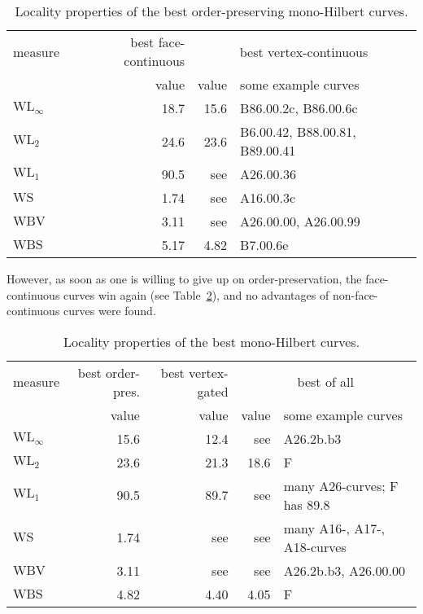 \documentclass[11pt,a4paper]{article}
\def\WLMax{\ensuremath{\mathrm{WL}_\infty}\xspace}
\def\WLEuc{\ensuremath{\mathrm{WL}_2}\xspace}
\def\WLMan{\ensuremath{\mathrm{WL}_1}\xspace}
\def\WS{\ensuremath{\mathrm{WS}}\xspace}
\def\WBV{\ensuremath{\mathrm{WBV}}\xspace}
\def\WBS{\ensuremath{\mathrm{WBS}}\xspace}
\begin{document}
\begin{table}
\centering
\begin{tabular}{|l|r|rl|}
\hline
measure & best face-continuous & \multicolumn{2}{c|}{best vertex-continuous} \\
        & value                & value & some example curves \\
\hline
\WLMax  &                18.7 &       15.6 & B86.00.2c, B86.00.6c \\
\WLEuc  &                24.6 &       23.6 & B6.00.42, B88.00.81, B89.00.41 \\
\WLMan  &                90.5 & see  & A26.00.36 \\
\WS     &                1.74 & see  & A16.00.3c \\
\WBV    &                3.11 & see  & A26.00.00, A26.00.99 \\
\WBS    &                5.17 &       4.82 & B7.00.6e \\
\hline
\end{tabular}
\caption{Locality properties of the best order-preserving mono-Hilbert curves.}
\label{tab:OmH}
\end{table}

However, as soon as one is willing to give up on order-preservation, the face-continuous curves win again (see Table~\ref{tab:mH}), and no advantages of non-face-continuous curves were found.

\begin{table}
\centering
\begin{tabular}{|l|r|r|rl|}
\hline
measure & best order-pres.
        & best vertex-gated
        & \multicolumn{2}{c|}{best of all} \\
        & value
        & value
        & value & some example curves \\
\hline
\WLMax  &             15.6 &             12.4 & see  & A26.2b.b3 \\
\WLEuc  &             23.6 &             21.3 &             18.6 & F \\ \WLMan  &             90.5 &             89.7 & see  & many A26-curves; F has 89.8\\
\WS     &             1.74 & see  & see  & many A16-, A17-, A18-curves\\
\WBV    &             3.11 & see  & see  & A26.2b.b3, A26.00.00 \\
\WBS    &             4.82 &             4.40 &             4.05 & F \\
\hline
\end{tabular}
\caption{Locality properties of the best mono-Hilbert curves.}
\label{tab:mH}
\end{table}
\end{document}
